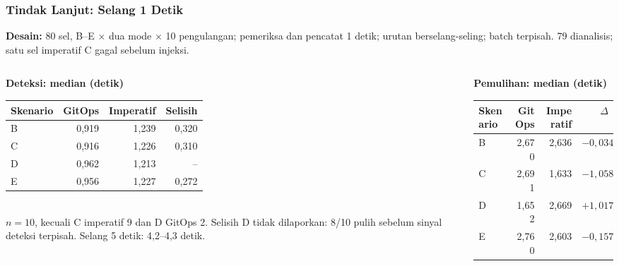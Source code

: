 {
\usebackgroundtemplate{\backgroundcontent}
\begin{frame}
    \frametitle{Tindak Lanjut: Selang 1 Detik}
    \scriptsize
    \textbf{Desain:} 80 sel, B--E $\times$ dua mode $\times$ 10 pengulangan; pemeriksa dan pencatat 1 detik; urutan berselang-seling; batch terpisah. 79 dianalisis; satu sel imperatif C gagal sebelum injeksi.
    \vspace{0.06cm}
    \begin{columns}[T]
        \begin{column}{0.48\textwidth}
            \centering\scriptsize
            \textbf{Deteksi: median (detik)}\\[2pt]
            \begin{tabular}{@{}lrrr@{}}
                \toprule
                \textbf{Skenario} & \textbf{GitOps} & \textbf{Imperatif} & \textbf{Selisih} \\
                \midrule
                B & 0,919 & 1,239 & 0,320 \\
                C & 0,916 & 1,226 & 0,310 \\
                D & 0,962 & 1,213 & -- \\
                E & 0,956 & 1,227 & 0,272 \\
                \bottomrule
            \end{tabular}\\[2pt]
            {\tiny $n=10$, kecuali C imperatif 9 dan D GitOps 2. Selisih D tidak dilaporkan: 8/10 pulih sebelum sinyal deteksi terpisah. Selang 5 detik: 4,2--4,3 detik.}
        \end{column}
        \begin{column}{0.48\textwidth}
            \centering\scriptsize
            \textbf{Pemulihan: median (detik)}\\[2pt]
            \begin{tabular}{@{}lrrr@{}}
                \toprule
                \textbf{Skenario} & \textbf{GitOps} & \textbf{Imperatif} & \textbf{$\Delta$} \\
                \midrule
                B & 2,670 & 2,636 & $-0{,}034$ \\
                C & 2,691 & 1,633 & $-1{,}058$ \\
                D & 1,652 & 2,669 & $+1{,}017$ \\
                E & 2,760 & 2,603 & $-0{,}157$ \\

\end{tabular}
\end{column}
\end{columns}
\end{frame}}
